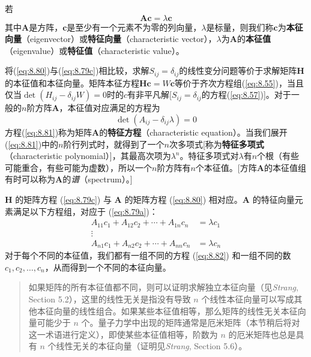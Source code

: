     若
    \begin{equation}
        \boxed{
            \mathbf{A} \mathbf{c} = \lambda \mathbf{c}
        }
        \label{eq:8.80}
    \end{equation}
    其中$\mathbf{A}$是方阵，$\mathbf{c}$是至少有一个元素不为零的列向量，$\lambda$是标量，则我们称$\mathbf{c}$为\textbf{本征向量}（eigenvector）或\textbf{特征向量}（characteristic vector），$\lambda$为$\mathbf{A}$的\textbf{本征值}（eigenvalue）或\textbf{特征值}（characteristic value）。

    将(\ref{eq:8.80})与(\ref{eq:8.79c})相比较，求解$S_{ij} = \delta_{ij}$的线性变分问题等价于求解矩阵$\mathbf{H}$的本征值和本征向量。矩阵本征方程$\mathbf{H}\mathbf{c} = W\mathbf{c}$等价于齐次方程组(\ref{eq:8.55})，当且仅当$\det\left(H_{ij} - \delta_{ij}W\right) = 0$时的$c$有非平凡解[$S_{ij} = \delta_{ij}$的方程(\ref{eq:8.57})]。对于一般的$n$阶方阵$\mathbf{A}$，本征值对应满足的方程为
    \begin{equation}
        \boxed{
            \det\left(A_{ij} - \delta_{ij}\lambda\right) = 0
        }
        \label{eq:8.81}
    \end{equation}
    方程(\ref{eq:8.81})称为矩阵$\mathbf{A}$的\textbf{特征方程}（characteristic equation）。当我们展开(\ref{eq:8.81})中的$n$阶行列式时，就得到了一个$n$次多项式[称为\textbf{特征多项式}（characteristic polynomial）]，其最高次项为$\lambda^n$。特征多项式对$\lambda$有$n$个根（有些可能重合，有些可能为虚数），所以一个$n$阶方阵有$n$个本征值。[方阵$\mathbf{A}$的本征值组有时可以称为$\mathbf{A}$的\textit{谱}（spectrum）。]

    $\mathbf{H}$ 的矩阵方程 (\ref{eq:8.79c}) 与 $\mathbf{A}$ 的矩阵方程 (\ref{eq:8.80}) 相对应。$\mathbf{A}$ 的特征向量元素满足以下方程组，对应于 (\ref{eq:8.79a})：
    \begin{equation}
        \begin{aligned}
            A_{11}c_1 + A_{12}c_2 + \cdots + A_{1n}c_n &= \lambda c_1 \\
            \vdots \\
            A_{n1}c_1 + A_{n2}c_2 + \cdots + A_{nn}c_n &= \lambda c_n
            \label{eq:8.82}
        \end{aligned}
    \end{equation}
    对于每个不同的本征值，我们都有一组不同的方程 (\ref{eq:8.82}) 和一组不同的数 $c_1,c_2,\ldots,c_n$，从而得到一个不同的本征向量。
    \begin{quote}
        \small
        \noindent 如果矩阵的所有本征值都不同，则可以证明求解独立本征向量（见\textit{Strang}, Section 5.2），这里的线性无关是指没有导致 $n$ 个线性本征向量可以写成其他本征向量的线性组合。如果某些本征值相等，那么矩阵的线性无关本征向量可能少于 $n$ 个。量子力学中出现的矩阵通常是厄米矩阵（本节稍后将对这一术语进行定义），即使某些本征值相等，阶数为 $n$ 的厄米矩阵也总是具有 $n$ 个线性无关的本征向量（证明见\textit{Strang}, Section 5.6）。
    \end{quote}

